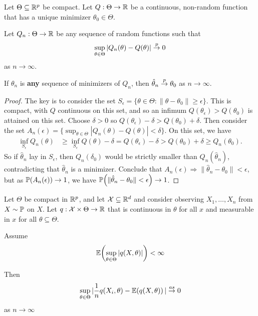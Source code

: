 \begin{thm}
  \label{defn:parametric_statistical_models:1}
  Let $\Theta \subseteq \mathbb{R}^{p}$ be compact.  Let $Q: \Theta
  \rightarrow \mathbb{R}$ be a continuous, non-random function that has a
  unique minimizer $\theta_{0} \in \Theta$.

  Let $Q_{n}: \Theta \rightarrow \mathbb{R}$ be any sequence of random
  functions such that
  \begin{equation}
    \label{eq:32}
    \sup_{\theta \in \Theta} |Q_{n}(\theta) - Q(\theta)| \overset{p}{\rightarrow} 0
  \end{equation} as $n \rightarrow \infty$.

  If $\theta_{n}$ is \textbf{any} sequence of minimizers of $Q_{n}$,
  then $\hat \theta_{n} \overset{p}{\rightarrow} \theta_{0}$ as $n \rightarrow \infty$.
\end{thm}

\begin{proof}
  The key is to consider the set $S_{\epsilon} = \{ \theta \in \Theta
  : \| \theta - \theta_{0} \| \geq \epsilon \} $.  This is compact,
  with $Q$ continuous on this set, and so an infimum
  $Q(\theta_{\epsilon}) > Q(\theta_{0})$ is attained on this set.
  Choose $\delta > 0$ so $Q(\theta_{\epsilon}) - \delta >
  Q(\theta_{0}) + \delta$.  Then consider the set $A_{n}(\epsilon) =
  \{ \sup_{\theta \in \Theta} | Q_{n}(\theta) - Q(\theta) | < \delta
  \} $.  On this set, we have
  \begin{align}
    \label{eq:43}
    \inf_{S_{\epsilon}} Q_{n}(\theta) &\geq \inf_{S_{\epsilon}}
    Q(\theta) - \delta = Q(\theta_{\epsilon}) - \delta > Q(\theta_{0})
    + \delta \geq Q_{n}(\theta_{0}).
  \end{align}
  So if $\hat \theta_{n}$ lay in $S_{\epsilon}$, then
  $Q_{n}(\delta_{0})$ would be strictly smaller than $Q_{n}(\hat
  \theta_{n})$, contradicting that $\hat \theta_{n}$ is a minimizer.
  Conclude that $A_{n}(\epsilon) \Rightarrow \| \hat \theta_{n} -
  \theta_{0} \| < \epsilon$, but as $\Prob{A_{n}(\epsilon)}
  \rightarrow 1$, we have $\Prob{\| \hat \theta_{n} - \theta_{0} \| <
    \epsilon} \rightarrow 1$.
\end{proof}

\begin{thm}
  Let $\Theta$ be compact in $\mathbb{R}^{p}$, and let $\mathcal{X} \subseteq \mathbb{R}^{d}$
  and consider observing $X_{1}, \dots, X_{n}$ \iid from $X \sim
  \Prob$ on $X$.  Let $q: \mathcal{X} \times \Theta \rightarrow \mathbb{R}$
  that is continuous in $\theta$ for all $x$ and measurable in $x$ for
  all $\theta \subseteq \Theta$.

  Assume
  \begin{equation}
    \label{eq:50}
    \E{\sup_{\theta \in \Theta} | q(X, \theta)|} < \infty
  \end{equation}

  Then
  \begin{equation}
    \label{eq:51}
    \sup_{\theta \in \Theta} | \frac{1}{n} q(X_{i}, \theta) - \E{q(X,
      \theta)} | \cas 0
  \end{equation} as $n \rightarrow \infty$
\end{thm}

